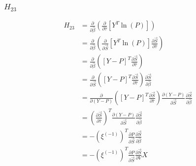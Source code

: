\documentclass{article}
\begin{document}
\subsubsection{$H_{23}$}
\begin{equation}
\begin{aligned}
H_{23} &= \frac{\partial}{\partial \hat{\beta}}  \left( \frac{\partial}{\partial \hat{\tau}}  \left[ Y^T \ln \left( P \right) \right] \right) 
\\
&= \frac{\partial}{\partial \hat{\beta}}  \left( \frac{\partial}{\partial \vec{S}}  \left[ Y^T \ln \left( P \right) \right] \frac{\partial \vec{S}}{\partial \hat{\tau}} \right) 
\\
&= \frac{\partial}{\partial \hat{\beta}}  \left( \left[ Y - P \right]^T \frac{\partial \vec{S}}{\partial \hat{\tau}} \right) 
\\
&= \frac{\partial}{\partial \vec{S}}  \left( \left[ Y - P \right]^T \frac{\partial \vec{S}}{\partial \hat{\tau}} \right) \frac{\partial \vec{S}}{\partial \hat{\beta}} 
\\
&= \frac{\partial}{\partial \left( Y - P \right)}  \left( \left[ Y - P \right]^T \frac{\partial \vec{S}}{\partial \hat{\tau}} \right) \frac{\partial \left( Y - P \right)}{\partial \vec{S}} \frac{\partial \vec{S}}{\partial \hat{\beta}} 
\\
&= \left( \frac{\partial \vec{S}}{\partial \hat{\tau}} \right)^T \frac{\partial \left( Y - P \right)}{\partial \vec{S}} \frac{\partial \vec{S}}{\partial \hat{\beta}} 
\\
&= - \left( \xi^{(-1)} \right)^T \frac{\partial P}{\partial \vec{S}} \frac{\partial \vec{S}}{\partial \hat{\beta}} \\
&= - \left( \xi^{(-1)} \right)^T \frac{\partial P}{\partial \vec{S}} \frac{\partial \vec{S}}{\partial V} X
\end{aligned}
\end{equation}
\end{document}
